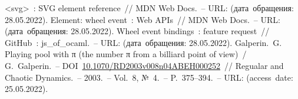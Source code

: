 \begin{thebibliography}{00}
      <svg>~: SVG element reference~// MDN Web Docs.~--
      URL: \underline{}
      (дата~обращения: 28.05.2022). 
      Element: wheel event~: Web APIs~// MDN Web Docs.~--
      URL: \underline{}
      (дата~обращения: 28.05.2022). 
      Wheel event bindings~: feature request~// GitHub~: js\_of\_ocaml.~--
      URL: \underline{}
      (дата~обращения: 28.05.2022). 
      Galperin.~G. Playing pool with π (the number π from a billiard point of view)~/
      G.~Galperin.~--
  DOI~\href{https://doi.org/10.1070/RD2003v008n04ABEH000252}{10.1070/RD2003v008n04ABEH000252}~//
  Regualar and Chaotic Dynamics.~--
  2003.~-- Vol.~8, №~4.~-- P.~375--394.~--
  URL: \underline{}
  (access~date: 25.05.2022).
  

\end{thebibliography}
